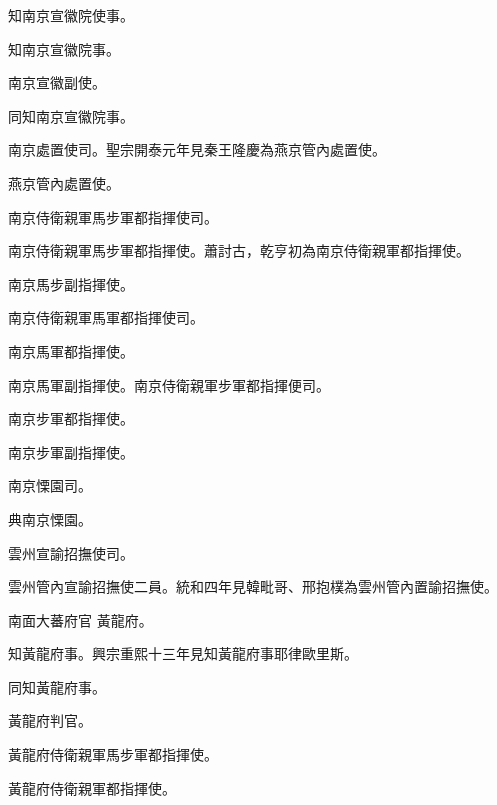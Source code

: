 \begin{pinyinscope}
 知南京宣徽院使事。



 知南京宣徽院事。



 南京宣徽副使。



 同知南京宣徽院事。



 南京處置使司。聖宗開泰元年見秦王隆慶為燕京管內處置使。



 燕京管內處置使。



 南京侍衛親軍馬步軍都指揮使司。



 南京侍衛親軍馬步軍都指揮使。蕭討古，乾亨初為南京侍衛親軍都指揮使。



 南京馬步副指揮使。



 南京侍衛親軍馬軍都指揮使司。



 南京馬軍都指揮使。



 南京馬軍副指揮使。南京侍衛親軍步軍都指揮便司。



 南京步軍都指揮使。



 南京步軍副指揮使。



 南京慄園司。



 典南京慄園。



 雲州宣諭招撫使司。



 雲州管內宣諭招撫使二員。統和四年見韓毗哥、邢抱樸為雲州管內置諭招撫使。



 南面大蕃府官
 黃龍府。



 知黃龍府事。興宗重熙十三年見知黃龍府事耶律歐里斯。



 同知黃龍府事。



 黃龍府判官。



 黃龍府侍衛親軍馬步軍都指揮使。



 黃龍府侍衛親軍都指揮使。




\end{pinyinscope}
